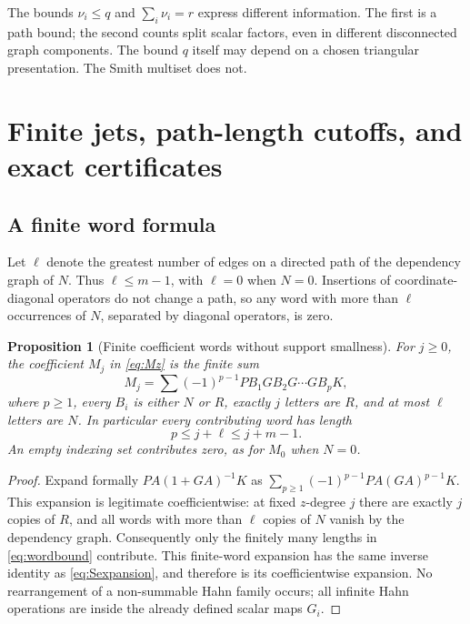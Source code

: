\documentclass[11pt,a4paper]{article}
\numberwithin{equation}{section}
\newtheorem{proposition}[theorem]{Proposition}
\theoremstyle{definition}
\theoremstyle{remark}\newtheorem{remark}[theorem]{Remark}
\begin{document}
The bounds $\nu_i\le q$ and $\sum_i\nu_i=r$ express different information. The first is a path bound; the second counts split scalar factors, even in different disconnected graph components. The bound $q$ itself may depend on a chosen triangular presentation. The Smith multiset does not.

\section{Finite jets, path-length cutoffs, and exact certificates}
\label{sec:certificates}
\subsection{A finite word formula}
Let $\ell$ denote the greatest number of edges on a directed path of the dependency graph of $N$. Thus $\ell\le m-1$, with $\ell=0$ when $N=0$. Insertions of coordinate-diagonal operators do not change a path, so any word with more than $\ell$ occurrences of $N$, separated by diagonal operators, is zero.

\begin{proposition}[Finite coefficient words without support smallness]
\label{prop:words}
For $j\ge0$, the coefficient $M_j$ in \eqref{eq:Mz} is the finite sum
\begin{equation}
 M_j=\sum (-1)^{p-1}P B_1G B_2G\cdots G B_p K,
 \label{eq:words}
\end{equation}
where $p\ge1$, every $B_i$ is either $N$ or $R$, exactly $j$ letters are $R$, and at most $\ell$ letters are $N$. In particular every contributing word has length
\begin{equation}
 p\le j+\ell\le j+m-1.
 \label{eq:wordbound}
\end{equation}
An empty indexing set contributes zero, as for $M_0$ when $N=0$.
\end{proposition}
\begin{proof}
Expand formally $PA(1+GA)^{-1}K$ as $\sum_{p\ge1}(-1)^{p-1}PA(GA)^{p-1}K$. This expansion is legitimate coefficientwise: at fixed $z$-degree $j$ there are exactly $j$ copies of $R$, and all words with more than $\ell$ copies of $N$ vanish by the dependency graph. Consequently only the finitely many lengths in \eqref{eq:wordbound} contribute. This finite-word expansion has the same inverse identity as \eqref{eq:Sexpansion}, and therefore is its coefficientwise expansion. No rearrangement of a non-summable Hahn family occurs; all infinite Hahn operations are inside the already defined scalar maps $G_i$.
\end{proof}
\end{document}
